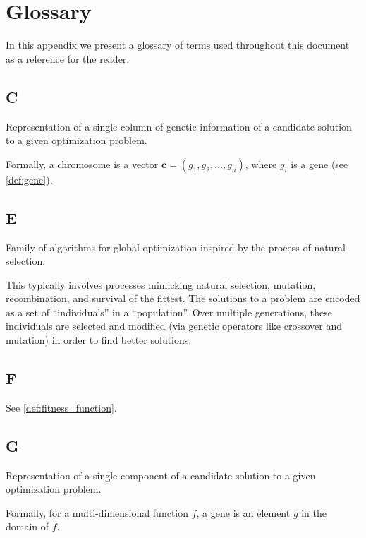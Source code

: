 \chapter{Glossary}
\label{appendix:glossary}
  In this appendix we present a glossary of terms used throughout this document as a reference for
  the reader.

  \section*{C}
    \begin{definition}[Chromosome]
    \label{def:chromosome}
      Representation of a single column of genetic information of a candidate solution to a given
      optimization problem.

      Formally, a chromosome is a vector \(\textbf{c} = (g_1, g_2, \dots, g_n)\), where \(g_i\) is a
      gene (see \vref{def:gene}).
    \end{definition}

  \section*{E}
    \begin{definition}
    \label{def:evolutionary_computation}
      Family of algorithms for global optimization inspired by the process of natural selection.

      This typically involves processes mimicking natural selection, mutation, recombination, and 
      survival of the fittest. 
      The solutions to a problem are encoded as a set of \enquote{individuals} in a 
      \enquote{population}. 
      Over multiple generations, these individuals are selected and modified (via genetic operators 
      like crossover and mutation) in order to find better solutions.
    \end{definition}

  \section*{F}
    \begin{definition}
      See \vref{def:fitness_function}.
    \end{definition}
    
  \section*{G}
    \begin{definition}[Gene]
    \label{def:gene}
      Representation of a single component of a candidate solution to a given optimization problem.

      Formally, for a multi-dimensional function \(f\), a gene is an element \(g\) in the domain of
      \(f\).
    \end{definition}

